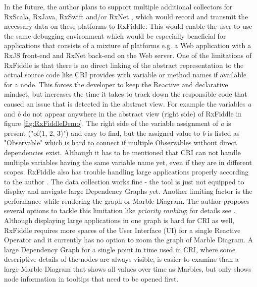	In the future, the author plans to support multiple additional collectors for RxScala, RxJava, RxSwift and/or RxNet \cite{RxFiddleTutorials}, which would record and transmit the necessary data on these platforms to RxFiddle. This would enable the user to use the same debugging environment which would be especially beneficial for applications that consists of a mixture of platforms e.g. a Web application with a RxJS front-end and RxNet back-end on the Web server.
	One of the limitations of RxFiddle is that there is no direct linking of the abstract representation to the actual source code like CRI provides with variable or method names if available for a node. This forces the developer to keep the Reactive and declarative mindset, but increases the time it takes to track down the responsible code that caused an issue that is detected in the abstract view. For example the variables \emph{a} and \emph{b} do not appear anywhere in the abstract view (right side) of RxFiddle in figure \ref{fig:RxFiddleDemo}. The right side of the variable assignment of \emph{a} is present ("of(1, 2, 3)") and easy to find, but the assigned value to \emph{b} is listed as "Observable" which is hard to connect if multiple Observables without direct dependencies exist. Although it has to be mentioned that CRI can not handle multiple variables having the same variable name yet, even if they are in different scopes.
	RxFiddle also has trouble handling large applications properly according to the author \cite[Issue 6]{RxFiddleGitHub}. The data collection works fine - the tool is just not equipped to display and navigate large Dependency Graphs yet. Another limiting factor is the performance while rendering the graph or Marble Diagram. The author proposes several options to tackle this limitation like \emph{priority ranking}; for details see \cite[Issue 6]{RxFiddleGitHub}. Although displaying large applications in one graph is hard for CRI as well, RxFiddle requires more spaces of the User Interface (UI) for a single Reactive Operator and it currently has no option to zoom the graph of Marble Diagram. A large Dependency Graph for a single point in time used in CRI, where some descriptive details of the nodes are always visible, is easier to examine than a large Marble Diagram that shows all values over time as Marbles, but only shows node information in tooltips that need to be opened first.
